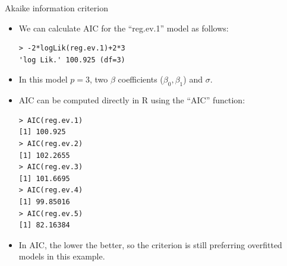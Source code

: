 \documentclass[handout]{beamer}
\begin{document}
\begin{frame}[fragile]{Akaike information criterion}
\scriptsize{

\begin{itemize}
\item We can calculate AIC for the ``reg.ev.1'' model as follows:

\begin{verbatim}
> -2*logLik(reg.ev.1)+2*3
'log Lik.' 100.925 (df=3) 
\end{verbatim}

\item In this model $p=3$, two $\beta$ coefficients ($\beta_0,\beta_1$) and $\sigma$.

\item AIC can be computed directly in R using the ``AIC'' function:

\begin{verbatim}
> AIC(reg.ev.1)
[1] 100.925
> AIC(reg.ev.2)
[1] 102.2655
> AIC(reg.ev.3)
[1] 101.6695
> AIC(reg.ev.4)
[1] 99.85016
> AIC(reg.ev.5)
[1] 82.16384 
\end{verbatim}

\item In AIC, the lower the better, so the criterion is still preferring overfitted models in this example.


\end{itemize}


} 
\end{frame}
\end{document}
